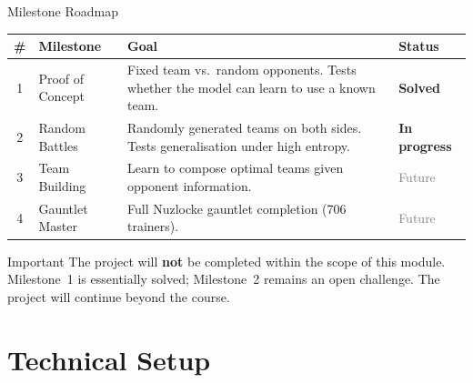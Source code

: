 \documentclass[aspectratio=169, 11pt]{beamer}
\begin{document}
\begin{frame}{Milestone Roadmap}
  \begin{center}
    \small
    \begin{tabularx}{\textwidth}{c l X l}
      \toprule
      \textbf{\#} & \textbf{Milestone} & \textbf{Goal} & \textbf{Status} \\
      \midrule
      1 & Proof of Concept &
        Fixed team vs.\ random opponents. Tests whether the model can
        learn to use a known team. &
        \textcolor{successGreen}{\textbf{Solved}} \\
      2 & Random Battles &
        Randomly generated teams on both sides. Tests generalisation
        under high entropy. &
        \textcolor{accentOrange}{\textbf{In progress}} \\
      3 & Team Building &
        Learn to compose optimal teams given opponent information. &
        \textcolor{gray}{Future} \\
      4 & Gauntlet Master &
        Full Nuzlocke gauntlet completion (706 trainers). &
        \textcolor{gray}{Future} \\
      \bottomrule
    \end{tabularx}
  \end{center}

  \vspace{0.8em}
  \begin{alertblock}{Important}
    The project will \textbf{not} be completed within the scope of this module.
    Milestone~1 is essentially solved; Milestone~2 remains an open challenge.
    The project will continue beyond the course.
  \end{alertblock}
\end{frame}

\section{Technical Setup}
\end{document}
